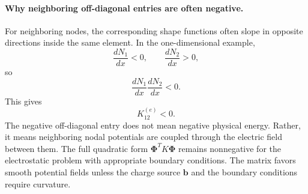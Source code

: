 \documentclass[11pt]{article}
\begin{document}
\paragraph{Why neighboring off-diagonal entries are often negative.}
For neighboring nodes, the corresponding shape functions often slope in opposite directions inside the same element. In the one-dimensional example,
\begin{equation}
\frac{dN_1}{dx}<0,
\qquad
\frac{dN_2}{dx}>0,
\end{equation}
so
\begin{equation}
\frac{dN_1}{dx}\frac{dN_2}{dx}<0.
\end{equation}
This gives
\begin{equation}
K_{12}^{(e)}<0.
\end{equation}
The negative off-diagonal entry does not mean negative physical energy. Rather, it means neighboring nodal potentials are coupled through the electric field between them. The full quadratic form $\bm{\Phi}^T K\bm{\Phi}$ remains nonnegative for the electrostatic problem with appropriate boundary conditions. The matrix favors smooth potential fields unless the charge source $\bm{b}$ and the boundary conditions require curvature.
\end{document}
